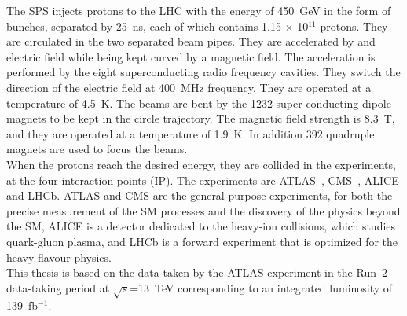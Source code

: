 The SPS injects protons to the LHC with the energy of 450~GeV in the form of bunches, separated by 25~ns, each of which contains 1.15 $\times$ 10$^{11}$ protons. They are circulated in the two separated beam pipes. They are accelerated by and electric field while being kept curved by a magnetic field. The acceleration is performed by the eight superconducting radio frequency cavities. 
They switch the direction of the electric field at 400~MHz frequency.
They are operated at a temperature of 4.5~K. The beams are bent by the 1232 super-conducting dipole magnets to be kept in the circle trajectory. The magnetic field strength is 8.3~T, and they are operated at a temperature of 1.9~K. In addition 392 quadruple magnets are used to focus the beams. \\
When the protons reach the desired energy, they are collided in the experiments, at the four interaction points (IP). 
The experiments are ATLAS~\cite{PERF-2007-01}, CMS~\cite{CMS-TDR-08-001}, ALICE and LHCb. 
ATLAS and CMS are the general purpose experiments, for both the precise measurement of the SM processes and the discovery of the physics beyond the SM, ALICE is a detector dedicated to the heavy-ion collisions, which studies quark-gluon plasma, and LHCb is a forward experiment that is optimized for the heavy-flavour physics. \\
This thesis is based on the data taken by the ATLAS experiment in the Run~2 data-taking period at $\sqrt{s}$=13~TeV corresponding to an integrated luminosity of 139~fb$^{-1}$.
